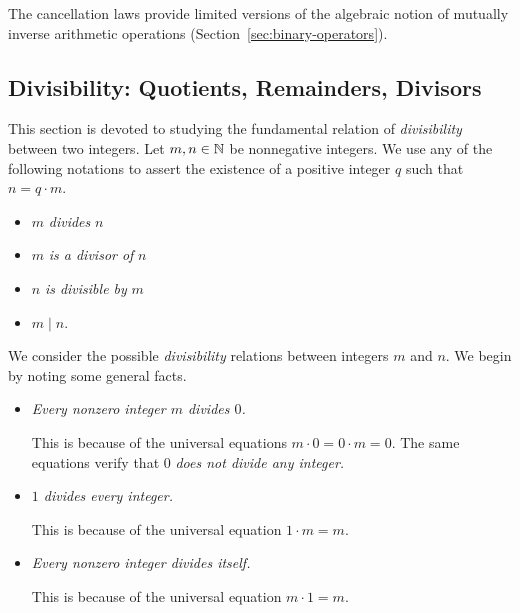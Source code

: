 \noindent
The cancellation laws provide limited versions of the algebraic notion of mutually inverse arithmetic operations (Section~\ref{sec:binary-operators}).


\subsection{Divisibility: Quotients, Remainders, Divisors}
\label{sec:divisibility}
 

This section is devoted to studying the fundamental relation of {\em divisibility} between two integers.  Let $m, n \in \mathbb{N}$ be nonnegative integers.  We use any of the following notations to assert the existence of a positive integer $q$ such that $n = q \cdot m$.
 
\begin{itemize}
\item
$m$ {\it divides} $n$
\medskip\item
$m$ {\it is a divisor of} $n$
\medskip\item
$n$ {\it is divisible by} $m$
\medskip\item
$m \mid n$.
\end{itemize}
We consider the possible {\it divisibility} relations between integers $m$ and $n$.  We begin by noting some general facts.
\begin{itemize}
\item
{\em Every nonzero integer $m$ divides $0$.}

\smallskip

This is because of the universal equations $m \cdot 0 = 0 \cdot m = 0$.   The same equations verify that $0$ {\em does not divide any integer.}

\medskip\item
{\em $1$ divides every integer.}

\smallskip

This is because of the universal equation $1 \cdot m = m$.
\medskip\item
{\em Every nonzero integer divides itself.}

\smallskip

This is because of the universal equation $m \cdot 1 = m$.
\end{itemize}

